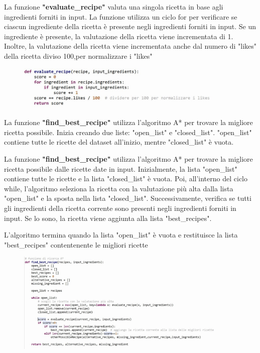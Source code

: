 \documentclass[12pt]{report}
\begin{document}
La funzione \textbf{"evaluate\_recipe"} valuta una singola ricetta in base agli ingredienti forniti in input. La funzione utilizza un ciclo for per verificare se ciascun ingrediente della ricetta è presente negli ingredienti forniti in input. Se un ingrediente è presente, la valutazione della ricetta viene incrementata di 1. Inoltre, la valutazione della ricetta viene incrementata anche dal numero di "likes" della ricetta diviso 100,per normalizzare i "likes"
\begin{figure}[H]
        \centering
        {\includegraphics[width=0.9\textwidth]{img/img10.jpg}}
\end{figure}

La funzione \textbf{"find\_best\_recipe"} utilizza l'algoritmo A* per trovare la migliore ricetta possibile. Inizia creando due liste: "open\_list" e "closed\_list". "open\_list" contiene tutte le ricette del dataset all'inizio, mentre "closed\_list" è vuota.

La funzione \textbf{"find\_best\_recipe"} utilizza l'algoritmo A* per trovare la migliore ricetta possibile dalle ricette date in input. Inizialmente, la lista "open\_list" contiene tutte le ricette e la lista "closed\_list" è vuota. Poi, all'interno del ciclo while, l'algoritmo seleziona la ricetta con la valutazione più alta dalla lista "open\_list" e la sposta nella lista "closed\_list". Successivamente, verifica se tutti gli ingredienti della ricetta corrente sono presenti negli ingredienti forniti in input. Se lo sono, la ricetta viene aggiunta alla lista "best\_recipes".

L'algoritmo termina quando la lista "open\_list" è vuota e restituisce la lista "best\_recipes" contentenente le migliori ricette
\begin{figure}[H]
        \centering
        {\includegraphics[width=0.9\textwidth]{img/img11.jpg}}
\end{figure}
\end{document}
